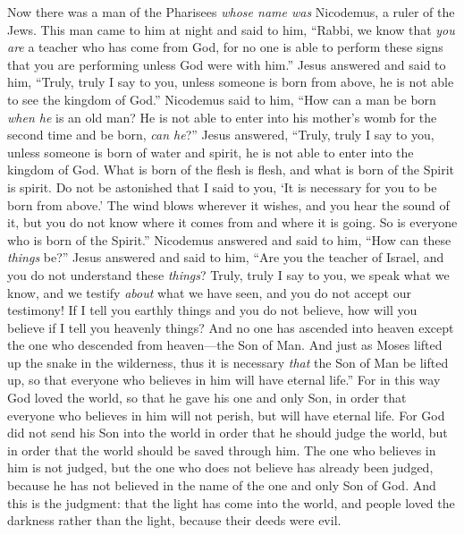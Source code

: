 \begin{biblechapter} %
 Now there was a man of the Pharisees \textit{whose name was} Nicodemus, a ruler of the Jews.
\verse This man came to him at night and said to him, “Rabbi, we know that \textit{you are} a teacher who has come from God, for no one is able to perform these signs that you are performing unless God were with him.”
\verse Jesus answered and said to him, “Truly, truly I say to you, unless someone is born from above, he is not able to see the kingdom of God.”
\verse Nicodemus said to him, “How can a man be born \textit{when he} is an old man? He is not able to enter into his mother’s womb for the second time and be born, \textit{can he}?”
\verse Jesus answered, “Truly, truly I say to you, unless someone is born of water and spirit, he is not able to enter into the kingdom of God.
\verse What is born of the flesh is flesh, and what is born of the Spirit is spirit.
\verse Do not be astonished that I said to you, ‘It is necessary for you to be born from above.’
\verse The wind blows wherever it wishes, and you hear the sound of it, but you do not know where it comes from and where it is going. So is everyone who is born of the Spirit.”
\verse Nicodemus answered and said to him, “How can these \textit{things} be?”
\verse Jesus answered and said to him, “Are you the teacher of Israel, and you do not understand these \textit{things}?
\verse Truly, truly I say to you, we speak what we know, and we testify \textit{about} what we have seen, and you do not accept our testimony!
\verse If I tell you earthly things and you do not believe, how will you believe if I tell you heavenly things?
\verse And no one has ascended into heaven except the one who descended from heaven—the Son of Man.
\verse And just as Moses lifted up the snake in the wilderness, thus it is necessary \textit{that} the Son of Man be lifted up,
\verse so that everyone who believes in him will have eternal life.”
 For in this way God loved the world, so that he gave his one and only Son, in order that everyone who believes in him will not perish, but will have eternal life.
\verse For God did not send his Son into the world in order that he should judge the world, but in order that the world should be saved through him.
\verse The one who believes in him is not judged, but the one who does not believe has already been judged, because he has not believed in the name of the one and only Son of God.
\verse And this is the judgment: that the light has come into the world, and people loved the darkness rather than the light, because their deeds were evil.

\end{biblechapter}
